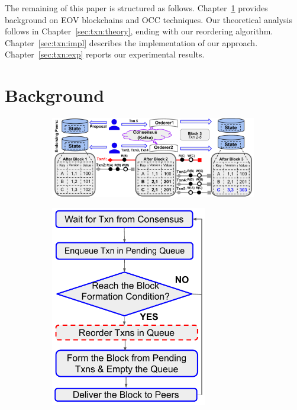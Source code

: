The remaining of this paper is structured as follows.
%
Chapter~\ref{sec:txn:background} provides background on EOV blockchains and OCC techniques. 
%
Our theoretical analysis follows in Chapter~\ref{sec:txn:theory}, ending with our
reordering algorithm.
%
Chapter~\ref{sec:txn:impl} describes the implementation of our approach.
%
Chapter~\ref{sec:txn:exp} reports our experimental results.

\section{Background}
\label{sec:txn:background}
\begin{figure}[h!]
    \begin{subfigure}{0.71\textwidth}
      \centering
      \includegraphics[width=0.99\textwidth]{diagram/txn/background.pdf}
      \caption{}
      \label{diagram:txn:background_fabric}
    \end{subfigure}
    \begin{subfigure}{0.28\textwidth}
      \centering
      \includegraphics[width=0.75\textwidth]{diagram/txn/fabric_orderer.pdf}

\end{subfigure}
\end{figure}
